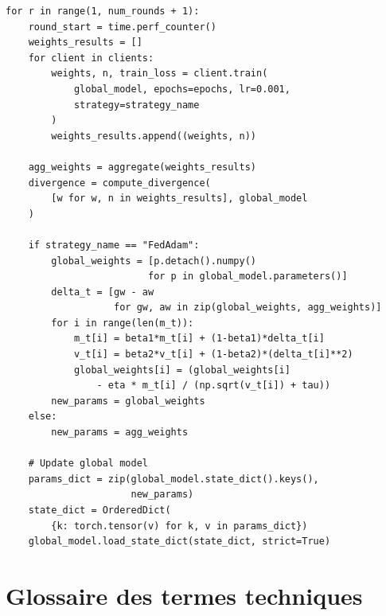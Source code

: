 \documentclass[12pt,a4paper]{report}
\begin{document}
\begin{lstlisting}[caption={Boucle principale de simulation f\'{e}d\'{e}r\'{e}e (extrait).},label={lst:simulation}]
for r in range(1, num_rounds + 1):
    round_start = time.perf_counter()
    weights_results = []
    for client in clients:
        weights, n, train_loss = client.train(
            global_model, epochs=epochs, lr=0.001,
            strategy=strategy_name
        )
        weights_results.append((weights, n))

    agg_weights = aggregate(weights_results)
    divergence = compute_divergence(
        [w for w, n in weights_results], global_model
    )

    if strategy_name == "FedAdam":
        global_weights = [p.detach().numpy()
                         for p in global_model.parameters()]
        delta_t = [gw - aw
                   for gw, aw in zip(global_weights, agg_weights)]
        for i in range(len(m_t)):
            m_t[i] = beta1*m_t[i] + (1-beta1)*delta_t[i]
            v_t[i] = beta2*v_t[i] + (1-beta2)*(delta_t[i]**2)
            global_weights[i] = (global_weights[i]
                - eta * m_t[i] / (np.sqrt(v_t[i]) + tau))
        new_params = global_weights
    else:
        new_params = agg_weights

    # Update global model
    params_dict = zip(global_model.state_dict().keys(),
                      new_params)
    state_dict = OrderedDict(
        {k: torch.tensor(v) for k, v in params_dict})
    global_model.load_state_dict(state_dict, strict=True)
\end{lstlisting}

\chapter{Glossaire des termes techniques}
\end{document}
